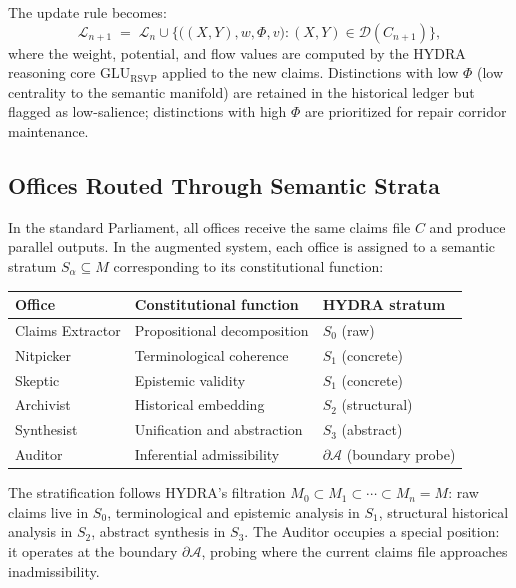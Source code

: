 \documentclass[12pt, a4paper]{article}
\theoremstyle{plain}
\theoremstyle{definition}
\theoremstyle{remark}
\begin{document}
The update rule becomes:
\[
\mathcal{L}_{n+1} \;=\; \mathcal{L}_n \cup \bigl\{ \bigl((X,Y), w, \Phi, v\bigr) : (X,Y) \in \mathcal{D}(C_{n+1}) \bigr\},
\]
where the weight, potential, and flow values are computed by the HYDRA reasoning core $\mathrm{GLU}_\mathrm{RSVP}$ applied to the new claims. Distinctions with low $\Phi$ (low centrality to the semantic manifold) are retained in the historical ledger but flagged as low-salience; distinctions with high $\Phi$ are prioritized for repair corridor maintenance.

\subsection{Offices Routed Through Semantic Strata}

In the standard Parliament, all offices receive the same claims file $C$ and produce parallel outputs. In the augmented system, each office is assigned to a semantic stratum $S_\alpha \subseteq M$ corresponding to its constitutional function:

\begin{center}
\renewcommand{\arraystretch}{1.35}
\begin{tabular}{p{3.2cm} p{4.5cm} p{4.5cm}}
\toprule
\textbf{Office} & \textbf{Constitutional function} & \textbf{HYDRA stratum} \\
\midrule
Claims Extractor & Propositional decomposition & $S_0$ (raw) \\
Nitpicker & Terminological coherence & $S_1$ (concrete) \\
Skeptic & Epistemic validity & $S_1$ (concrete) \\
Archivist & Historical embedding & $S_2$ (structural) \\
Synthesist & Unification and abstraction & $S_3$ (abstract) \\
Auditor & Inferential admissibility & $\partial\mathcal{A}$ (boundary probe) \\
\bottomrule
\end{tabular}
\end{center}

The stratification follows HYDRA's filtration $M_0 \subset M_1 \subset \cdots \subset M_n = M$: raw claims live in $S_0$, terminological and epistemic analysis in $S_1$, structural historical analysis in $S_2$, abstract synthesis in $S_3$. The Auditor occupies a special position: it operates at the boundary $\partial\mathcal{A}$, probing where the current claims file approaches inadmissibility.
\end{document}
